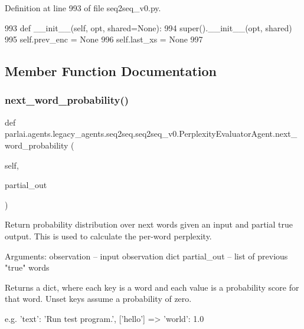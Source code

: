 Definition at line 993 of file seq2seq\+\_\+v0.\+py.


\begin{DoxyCode}
993     \textcolor{keyword}{def }\_\_init\_\_(self, opt, shared=None):
994         super().\_\_init\_\_(opt, shared)
995         self.prev\_enc = \textcolor{keywordtype}{None}
996         self.last\_xs = \textcolor{keywordtype}{None}
997 
\end{DoxyCode}


\subsection{Member Function Documentation}
\mbox{\label{classparlai_1_1agents_1_1legacy__agents_1_1seq2seq_1_1seq2seq__v0_1_1PerplexityEvaluatorAgent_ab6f67e52990f7cafdb7fbd2f6215e968}} 
\subsubsection{\texorpdfstring{next\+\_\+word\+\_\+probability()}{next\_word\_probability()}}
{\footnotesize\ttfamily def parlai.\+agents.\+legacy\+\_\+agents.\+seq2seq.\+seq2seq\+\_\+v0.\+Perplexity\+Evaluator\+Agent.\+next\+\_\+word\+\_\+probability (\begin{DoxyParamCaption}\item[{}]{self,  }\item[{}]{partial\+\_\+out }\end{DoxyParamCaption})}

\begin{DoxyVerb}Return probability distribution over next words given an input and partial true
output. This is used to calculate the per-word perplexity.

Arguments:
observation -- input observation dict
partial_out -- list of previous "true" words

Returns a dict, where each key is a word and each value is a probability
score for that word. Unset keys assume a probability of zero.

e.g.
{'text': 'Run test program.'}, ['hello'] => {'world': 1.0}
\end{DoxyVerb}
 

